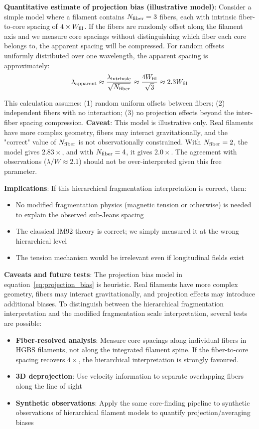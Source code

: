 \documentclass[11pt,a4paper]{article}
\begin{document}
\textbf{Quantitative estimate of projection bias (illustrative model)}: Consider a simple model where a filament contains $N_{\rm fiber} = 3$ fibers, each with intrinsic fiber-to-core spacing of $4\times W_{\rm fil}$. If the fibers are randomly offset along the filament axis and we measure core spacings without distinguishing which fiber each core belongs to, the apparent spacing will be compressed. For random offsets uniformly distributed over one wavelength, the apparent spacing is approximately:
\begin{equation}
\lambda_{\rm apparent} \approx \frac{\lambda_{\rm intrinsic}}{\sqrt{N_{\rm fiber}}} \approx \frac{4 W_{\rm fil}}{\sqrt{3}} \approx 2.3 W_{\rm fil}
\label{eq:projection_bias}
\end{equation}

This calculation assumes: (1) random uniform offsets between fibers; (2) independent fibers with no interaction; (3) no projection effects beyond the inter-fiber spacing compression. \textbf{Caveat}: This model is illustrative only. Real filaments have more complex geometry, fibers may interact gravitationally, and the "correct" value of $N_{\rm fiber}$ is not observationally constrained. With $N_{\rm fiber} = 2$, the model gives $2.83\times$, and with $N_{\rm fiber} = 4$, it gives $2.0\times$. The agreement with observations ($\lambda/W \approx 2.1$) should not be over-interpreted given this free parameter.

\textbf{Implications}: If this hierarchical fragmentation interpretation is correct, then:
\begin{itemize}
    \item No modified fragmentation physics (magnetic tension or otherwise) is needed to explain the observed sub-Jeans spacing
    \item The classical IM92 theory is correct; we simply measured it at the wrong hierarchical level
    \item The tension mechanism would be irrelevant even if longitudinal fields exist
\end{itemize}

\textbf{Caveats and future tests}: The projection bias model in equation~\ref{eq:projection_bias} is heuristic. Real filaments have more complex geometry, fibers may interact gravitationally, and projection effects may introduce additional biases. To distinguish between the hierarchical fragmentation interpretation and the modified fragmentation scale interpretation, several tests are possible:
\begin{itemize}
    \item \textbf{Fiber-resolved analysis}: Measure core spacings along individual fibers in HGBS filaments, not along the integrated filament spine. If the fiber-to-core spacing recovers $4\times$, the hierarchical interpretation is strongly favoured.
    \item \textbf{3D deprojection}: Use velocity information to separate overlapping fibers along the line of sight
    \item \textbf{Synthetic observations}: Apply the same core-finding pipeline to synthetic observations of hierarchical filament models to quantify projection/averaging biases
\end{itemize}
\end{document}
